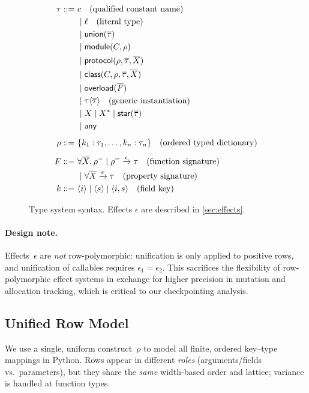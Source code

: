 \begin{figure}[t]
\centering
\begin{align*}
\tau ::=~& c \quad\text{(qualified constant name)} \\
 & \mid \ell \quad\text{(literal type)} \\
 & \mid \mathsf{union}(\overline{\tau}) \\
 & \mid \mathsf{module}(C, \mathord{\rho}) \\
 & \mid \mathsf{protocol}(\mathord{\rho}, \overline{\tau}, \overline{X}) \\
 & \mid \mathsf{class}(C, \mathord{\rho}, \overline{\tau}, \overline{X}) \\
 & \mid \mathsf{overload}(\overline{F}) \\
 & \mid \tau\langle\overline{\tau}\rangle \quad\text{(generic instantiation)} \\
 & \mid X \mid X^* \mid \mathsf{star}(\overline{\tau}) \\
 & \mid \mathsf{any}
\\[0.5em]
\mathord{\rho} ::=~& \{ k_1 : \tau_1, \ldots, k_n : \tau_n \} \quad\text{(ordered typed dictionary)}
\\[0.5em]
F ::=~& \forall \overline{X}.\,\mathord{\rho^{-}} \mid \mathord{\rho^{=}} \xrightarrow{\epsilon} \tau
\quad\text{(function signature)}\\
 & \mid \forall \overline{X}\xrightarrow{\epsilon} \tau \quad\text{(property signature)}
\\
k ::=~& \langle i\rangle \mid \langle s\rangle \mid \langle i, s\rangle
\quad\text{(field key)}
\end{align*}
\caption{Type system syntax. Effects $\epsilon$ are described in \autoref{sec:effects}.}
\label{fig:type-syntax}
\end{figure}

\paragraph{Design note.}
Effects~$\epsilon$ are \emph{not} row-polymorphic: unification is only applied to positive rows, and unification of callables requires $\epsilon_1 = \epsilon_2$.  
This sacrifices the flexibility of row-polymorphic effect systems in exchange for higher precision in mutation and allocation tracking, which is critical to our checkpointing analysis.

\subsection{Unified Row Model}
\label{sec:unified-record}
We use a single, uniform construct~$\rho$ to model all finite, ordered key--type mappings in Python.
Rows appear in different \emph{roles} (arguments/fields vs.\ parameters), but they share the \emph{same} width-based order and lattice; variance is handled at function types.



